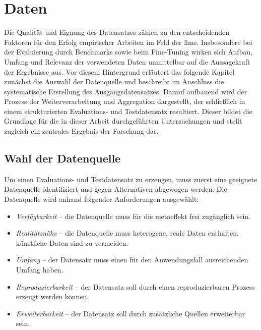 \chapter{Daten}\label{ch:daten}

Die Qualität und Eignung des Datensatzes zählen zu den entscheidenden Faktoren für den Erfolg empirischer Arbeiten im Feld der \glspl{llm}.
Insbesondere bei der Evaluierung durch Benchmarks sowie beim Fine-Tuning wirken sich Aufbau, Umfang und Relevanz der verwendeten Daten unmittelbar auf die Aussagekraft der Ergebnisse aus.
Vor diesem Hintergrund erläutert das folgende Kapitel zunächst die Auswahl der Datenquelle und beschreibt im Anschluss die systematische Erstellung des Ausgangsdatensatzes.
Darauf aufbauend wird der Prozess der Weiterverarbeitung und Aggregation dargestellt, der schließlich in einem strukturierten Evaluations- und Testdatensatz resultiert.
Dieser bildet die Grundlage für die in dieser Arbeit durchgeführten Untersuchungen und stellt zugleich ein zentrales Ergebnis der Forschung dar.


\section{Wahl der Datenquelle}\label{sec:wahl-der-datenquelle}

Um einen Evaluations- und Testdatensatz zu erzeugen, muss zuerst eine geeignete Datenquelle identifiziert und gegen Alternativen abgewogen werden.
Die Datenquelle wird anhand folgender Anforderungen ausgewählt:

\begin{itemize}
    \item \textit{Verfügbarkeit} -- die Datenquelle muss für die metaeffekt frei zugänglich sein.
    \item \textit{Realitätsnähe} -- die Datenquelle muss heterogene, reale Daten enthalten, künstliche Daten sind zu vermeiden.
    \item \textit{Umfang} -- der Datensatz muss einen für den Anwendungsfall ausreichenden Umfang haben.
    \item \textit{Reproduzierbarkeit} -- der Datensatz soll durch einen reproduzierbaren Prozess erzeugt werden können.
    \item \textit{Erweiterbarkeit} -- der Datensatz soll durch zusätzliche Quellen erweiterbar sein.
\end{itemize}

